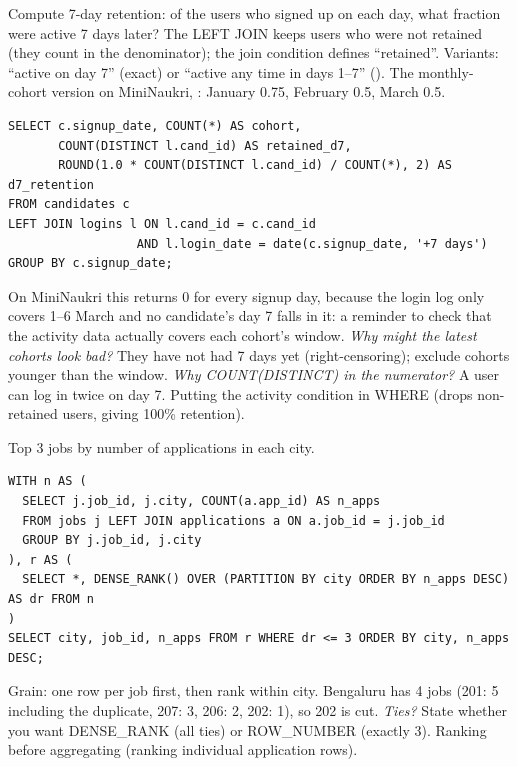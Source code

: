 \begin{qa}{\classic Compute 7-day retention: of the users who signed up on each day, what fraction were active 7 days later?}
\why The LEFT JOIN keeps users who were not retained (they count in the denominator); the join condition defines ``retained''. Variants: ``active on day
7'' (exact) or ``active any time in days 1--7'' ().
\worked The monthly-cohort version on MiniNaukri, : January 0.75, February 0.5, March 0.5.
\begin{lstlisting}[style=sql]
SELECT c.signup_date, COUNT(*) AS cohort,
       COUNT(DISTINCT l.cand_id) AS retained_d7,
       ROUND(1.0 * COUNT(DISTINCT l.cand_id) / COUNT(*), 2) AS d7_retention
FROM candidates c
LEFT JOIN logins l ON l.cand_id = c.cand_id
                  AND l.login_date = date(c.signup_date, '+7 days')
GROUP BY c.signup_date;
\end{lstlisting}
On MiniNaukri this returns 0 for every signup day, because the login log only covers 1--6 March and no candidate's day 7 falls in it: a reminder to check
that the activity data actually covers each cohort's window.
\pushes \emph{Why might the latest cohorts look bad?} They have not had 7 days yet (right-censoring); exclude cohorts younger than the window.
\emph{Why COUNT(DISTINCT) in the numerator?} A user can log in twice on day 7.
\pitfall Putting the activity condition in WHERE (drops non-retained users, giving 100\% retention).
\end{qa}

\begin{qa}{\classic Top 3 jobs by number of applications in each city.}
\worked
\begin{lstlisting}[style=sql]
WITH n AS (
  SELECT j.job_id, j.city, COUNT(a.app_id) AS n_apps
  FROM jobs j LEFT JOIN applications a ON a.job_id = j.job_id
  GROUP BY j.job_id, j.city
), r AS (
  SELECT *, DENSE_RANK() OVER (PARTITION BY city ORDER BY n_apps DESC) AS dr FROM n
)
SELECT city, job_id, n_apps FROM r WHERE dr <= 3 ORDER BY city, n_apps DESC;
\end{lstlisting}
\why Grain: one row per job first, then rank within city. Bengaluru has 4 jobs (201: 5 including the duplicate, 207: 3, 206: 2, 202: 1), so 202 is cut.
\pushes \emph{Ties?} State whether you want DENSE\_RANK (all ties) or ROW\_NUMBER (exactly 3).
\pitfall Ranking before aggregating (ranking individual application rows).
\end{qa}

